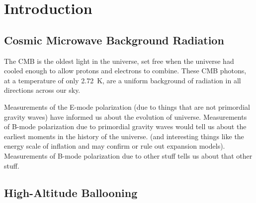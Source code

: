 \chapter{Introduction}
\label{intro_chapter}




\section{Cosmic Microwave Background Radiation}
\label{sec:cmb_science}


The \ac{CMB} is the oldest light in the universe, set free when the universe had cooled enough to allow protons and electrons to combine. 
These \ac{CMB} photons, at a temperature of only 2.72~K, are a uniform background of radiation in all directions across our sky. 


Measurements of the E-mode polarization (due to things that are not primordial gravity waves) have informed us about the evolution of universe. 
Measurements of B-mode polarization due to primordial gravity waves would tell us about the earliest moments in the history of the universe. (and interesting things like the energy scale of inflation and may confirm or rule out expansion models).
Measurements of B-mode polarization due to other stuff tells us about that other stuff. 


\section{High-Altitude Ballooning}
\label{sec:balloons}


